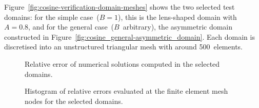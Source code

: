 Figure~\ref{fig:cosine-verification-domain-meshes}
shows the two selected test domains:
for the simple case~($B = 1$),
this is the lens-shaped domain with~$A = 0.8$,
and for the general case~($B$~arbitrary),
the asymmetric domain constructed
in Figure~\ref{fig:cosine_general-asymmetric_domain}.
Each domain is discretised into an unstructured triangular mesh
with around 500~elements.

\begin{figure}
  \newcommand*{\subfigurewidth}{0.42\textwidth}
  \centering
  \hspace*{\fill}
  \begin{subfigure}[t]{\subfigurewidth}
  \end{subfigure}
    \hfill
  \begin{subfigure}[t]{\subfigurewidth}
  \end{subfigure}
  \hspace*{\fill}
  \caption{
    Relative error of numerical solutions computed in the selected domains.
  }
  \label{fig:cosine-verification-relative-error}
\end{figure}

\begin{figure}
  \newcommand*{\subfigurewidth}{0.36\textwidth}
  \centering
  \hspace*{\fill}
  \begin{subfigure}[t]{\subfigurewidth}
  \end{subfigure}
    \hfill
  \begin{subfigure}[t]{\subfigurewidth}
  \end{subfigure}
  \hspace*{\fill}
  \caption{
    Histogram of relative errors
    evaluated at the finite element mesh nodes
    for the selected domains.
  }
  \label{fig:cosine-verification-relative-error-histogram}
\end{figure}

